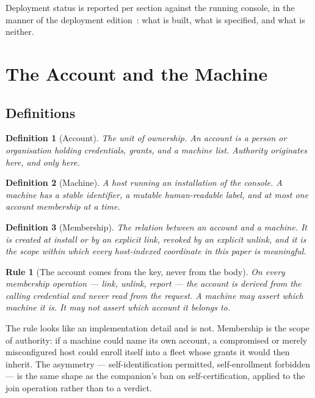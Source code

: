 \documentclass[11pt]{article}
\newtheorem{drule}{Rule}
\newtheorem{definition}{Definition}
\begin{document}
Deployment status is reported per section against the running console, in the manner of the deployment edition~\citep{yang2026v31}: what is built, what is specified, and what is neither.

\section{The Account and the Machine}
\label{sec:accountmachine}

\subsection{Definitions}

\begin{definition}[Account]
The unit of ownership. An account is a person or organisation holding credentials, grants, and a machine list. Authority originates here, and only here.
\end{definition}

\begin{definition}[Machine]
A host running an installation of the console. A machine has a stable identifier, a mutable human-readable \emph{label}, and at most one account membership at a time.
\end{definition}

\begin{definition}[Membership]
The relation between an account and a machine. It is created at install or by an explicit link, revoked by an explicit unlink, and it is the scope within which every host-indexed coordinate in this paper is meaningful.
\end{definition}

\begin{drule}[The account comes from the key, never from the body]
\label{rule:keyaccount}
On every membership operation --- link, unlink, report --- the account is derived from the calling credential and never read from the request. A machine may assert which machine it is. It may not assert which account it belongs to.
\end{drule}

The rule looks like an implementation detail and is not. Membership is the scope of authority: if a machine could name its own account, a compromised or merely misconfigured host could enroll itself into a fleet whose grants it would then inherit. The asymmetry --- self-identification permitted, self-enrollment forbidden --- is the same shape as the companion's ban on self-certification, applied to the join operation rather than to a verdict.
\end{document}
